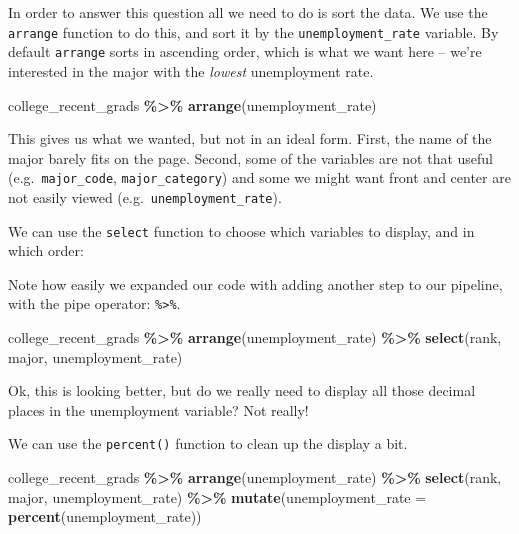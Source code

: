 \documentclass[
]{article}
\newenvironment{Shaded}{\begin{snugshade}}{\end{snugshade}}
\newcommand{\AttributeTok}[1]{\textcolor[rgb]{0.13,0.29,0.53}{#1}}
\newcommand{\FunctionTok}[1]{\textcolor[rgb]{0.13,0.29,0.53}{\textbf{#1}}}
\newcommand{\NormalTok}[1]{#1}
\newcommand{\SpecialCharTok}[1]{\textcolor[rgb]{0.81,0.36,0.00}{\textbf{#1}}}
\begin{document}
In order to answer this question all we need to do is sort the data. We
use the \texttt{arrange} function to do this, and sort it by the
\texttt{unemployment\_rate} variable. By default \texttt{arrange} sorts
in ascending order, which is what we want here -- we're interested in
the major with the \emph{lowest} unemployment rate.

\begin{Shaded}
\begin{Highlighting}[]
\NormalTok{college\_recent\_grads }\SpecialCharTok{\%\textgreater{}\%}
  \FunctionTok{arrange}\NormalTok{(unemployment\_rate)}
\end{Highlighting}
\end{Shaded}

This gives us what we wanted, but not in an ideal form. First, the name
of the major barely fits on the page. Second, some of the variables are
not that useful (e.g.~\texttt{major\_code}, \texttt{major\_category})
and some we might want front and center are not easily viewed
(e.g.~\texttt{unemployment\_rate}).

We can use the \texttt{select} function to choose which variables to
display, and in which order:

\begin{marginfigure}
Note how easily we expanded our code with adding another step to our
pipeline, with the pipe operator: \texttt{\%\textgreater{}\%}.
\end{marginfigure}

\begin{Shaded}
\begin{Highlighting}[]
\NormalTok{college\_recent\_grads }\SpecialCharTok{\%\textgreater{}\%}
  \FunctionTok{arrange}\NormalTok{(unemployment\_rate) }\SpecialCharTok{\%\textgreater{}\%}
  \FunctionTok{select}\NormalTok{(rank, major, unemployment\_rate)}
\end{Highlighting}
\end{Shaded}

Ok, this is looking better, but do we really need to display all those
decimal places in the unemployment variable? Not really!

We can use the \texttt{percent()} function to clean up the display a
bit.

\begin{Shaded}
\begin{Highlighting}[]
\NormalTok{college\_recent\_grads }\SpecialCharTok{\%\textgreater{}\%}
  \FunctionTok{arrange}\NormalTok{(unemployment\_rate) }\SpecialCharTok{\%\textgreater{}\%}
  \FunctionTok{select}\NormalTok{(rank, major, unemployment\_rate) }\SpecialCharTok{\%\textgreater{}\%}
  \FunctionTok{mutate}\NormalTok{(}\AttributeTok{unemployment\_rate =} \FunctionTok{percent}\NormalTok{(unemployment\_rate))}
\end{Highlighting}
\end{Shaded}
\end{document}
